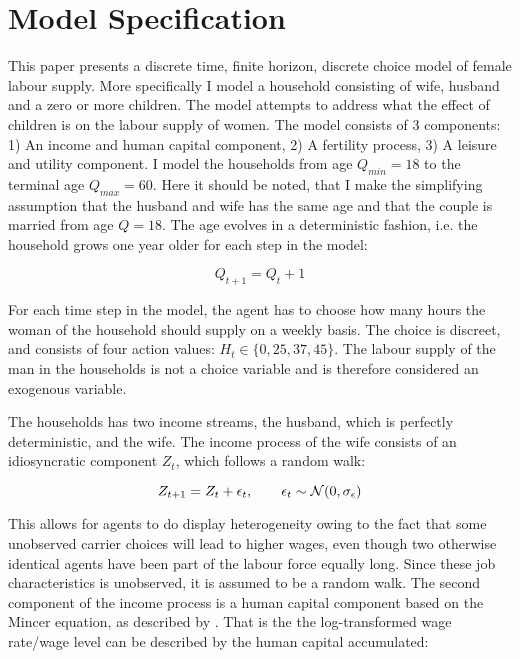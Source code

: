 \section{Model Specification}\label{sec:model1}

This paper presents a discrete time, finite horizon, discrete choice model of female labour supply. More specifically I model a household consisting of wife, husband and a zero or more children. The model attempts to address what the effect of children is on the labour supply of women. The model consists of 3 components: 1) An income and human capital component, 2) A fertility process, 3) A leisure and utility component. I model the households from age $Q_{min}=18$ to the terminal age $Q_{max} = 60$. Here it should be noted, that I make the simplifying assumption that the husband and wife has the same age and that the couple is married from age $Q=18$. The age evolves in a deterministic fashion, i.e. the household grows one year older for each step in the model:

\begin{equation}
    Q_{t+1} = Q_t + 1
\end{equation}

For each time step in the model, the agent has to  choose how many hours the woman of the household should supply on a weekly basis. The choice is discreet, and consists of four action values: $H_t \in \{0, 25, 37, 45 \}$. The labour supply of the man in the households is not a choice variable and is therefore considered an exogenous variable.

The households has two income streams, the husband, which is perfectly deterministic, and the wife. The income process of the wife consists of an idiosyncratic component $Z_t$, which follows a random walk:

\begin{equation}
    Z_{t+1} = Z_t + \epsilon_t, \qquad \epsilon_t \sim \mathcal{N} (0, \sigma_\epsilon)
\end{equation}

This allows for agents to do display heterogeneity owing to the fact that some unobserved carrier choices will lead to higher wages, even though two otherwise identical agents have been part of the labour force equally long. Since these job characteristics is unobserved, it is assumed to be a random walk. The second component of the income process is a human capital component based on the Mincer equation, as described by \textcite{lemieux_mincer_2006}. That is the the log-transformed wage rate/wage level can be described by the human capital accumulated:

